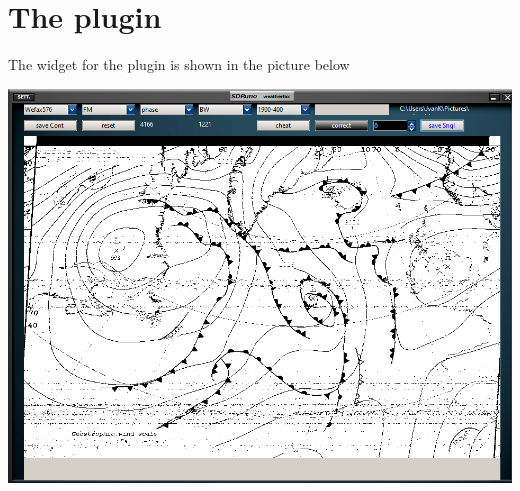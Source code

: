 \documentclass[11pt]{article}
\begin{document}
\section{The plugin}
The widget for the plugin is shown in the picture below

\includegraphics[width=140mm]{wfax-example-2.png}
\end{document}
